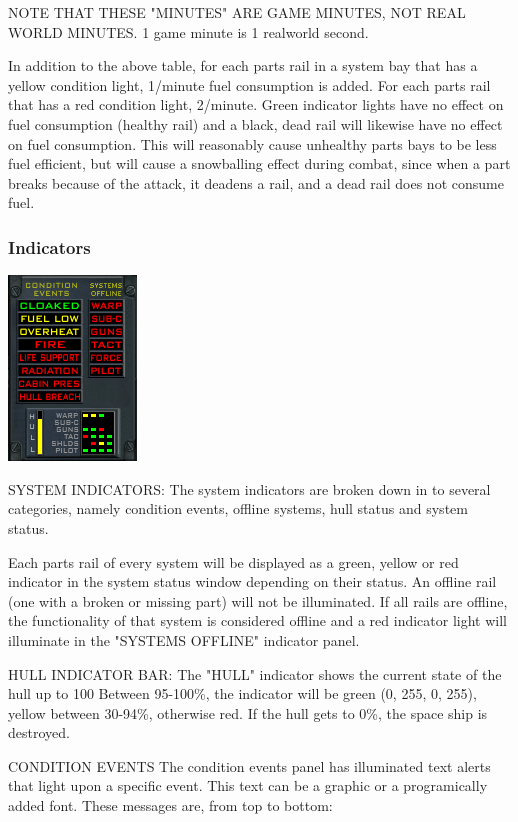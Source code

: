 \begin{itemize}
NOTE THAT THESE "MINUTES" ARE GAME MINUTES, NOT REAL WORLD MINUTES. 1 game minute is 1 realworld second. 

In addition to the above table, for each parts rail in a system bay that has a yellow condition light, 1\slash minute fuel consumption is added. For each parts rail that has a red condition light, 2\slash minute. Green indicator lights have no effect on fuel consumption (healthy rail) and a black, dead rail will likewise have no effect on fuel consumption. This will reasonably cause unhealthy parts bays to be less fuel efficient, but will cause a snowballing effect during combat, since when a part breaks because of the attack, it deadens a rail, and a dead rail does not consume fuel. 



\subsubsection{Indicators}
\includegraphics[scale=0.70]{images/indicators.png}

SYSTEM INDICATORS: 
The system indicators are broken down in to several categories, namely
condition events, offline systems, hull status and system status.

Each parts rail of every system will be displayed as a green, yellow or red
indicator in the system status window depending on their status.  An
offline rail (one with a broken or missing part) will not be illuminated.
If all rails are offline, the functionality of that system is considered
offline and a red indicator light will illuminate in the "SYSTEMS OFFLINE"
indicator panel.

HULL INDICATOR BAR:
The "HULL" indicator shows the current state of the hull up to 100%
Between 95-100\%, the indicator will be green (0, 255, 0, 255),
yellow between 30-94\%, otherwise red.  If the hull gets to 0\%, the
space ship is destroyed.  

CONDITION EVENTS
The condition events panel has illuminated text alerts that light upon a specific event. This text can be a graphic or a programically added font. These messages are, from top to bottom:


\end{itemize}
